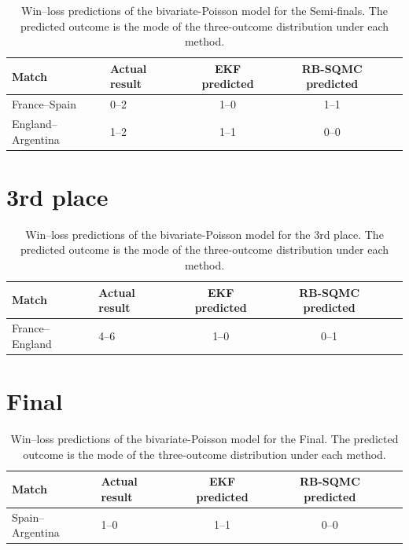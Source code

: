 \begin{table}[H]
\centering
\begin{tabular}{llccc}
\toprule
Match & Actual result & EKF predicted & RB-SQMC predicted \\
\midrule
France--Spain & 0--2 & 1--0 & 1--1 \\
England--Argentina & 1--2 & 1--1 & 0--0 \\
\bottomrule
\end{tabular}
\caption{Win--loss predictions of the bivariate-Poisson model for the Semi-finals. The predicted outcome is the mode of the three-outcome distribution under each method.}
\end{table}

\section{3rd place}

\begin{table}[H]
\centering
\begin{tabular}{llccc}
\toprule
Match & Actual result & EKF predicted & RB-SQMC predicted \\
\midrule
France--England & 4--6 & 1--0 & 0--1 \\
\bottomrule
\end{tabular}
\caption{Win--loss predictions of the bivariate-Poisson model for the 3rd place. The predicted outcome is the mode of the three-outcome distribution under each method.}
\end{table}

\section{Final}

\begin{table}[H]
\centering
\begin{tabular}{llccc}
\toprule
Match & Actual result & EKF predicted & RB-SQMC predicted \\
\midrule
Spain--Argentina & 1--0 & 1--1 & 0--0 \\
\bottomrule
\end{tabular}
\caption{Win--loss predictions of the bivariate-Poisson model for the Final. The predicted outcome is the mode of the three-outcome distribution under each method.}
\end{table}

